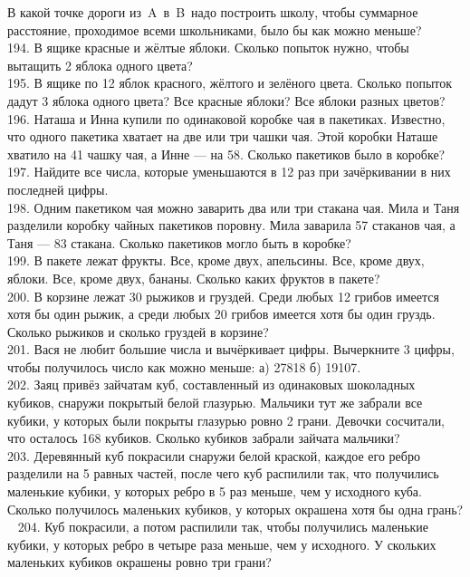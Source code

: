 В какой точке дороги из A в B надо построить школу, чтобы суммарное расстояние, проходимое всеми школьниками, было бы как можно меньше?\\
194. В ящике красные и жёлтые яблоки. Сколько попыток нужно, чтобы вытащить 2 яблока одного цвета?\\
195. В ящике по 12 яблок красного, жёлтого и зелёного цвета. Сколько попыток дадут 3 яблока одного цвета? Все красные яблоки? Все яблоки разных цветов?\\
196. Наташа и Инна купили по одинаковой коробке чая в пакетиках. Известно, что одного пакетика хватает на две или три чашки чая. Этой коробки Наташе хватило на 41 чашку чая, а Инне --- на 58. Сколько пакетиков было в коробке?\\
197. Найдите все числа, которые уменьшаются в 12 раз при зачёркивании в них последней цифры.\\
198. Одним пакетиком чая можно заварить два или три стакана чая. Мила и Таня разделили коробку чайных пакетиков поровну. Мила заварила 57 стаканов чая, а Таня --- 83 стакана. Сколько пакетиков могло быть в коробке?\\
199. В пакете лежат фрукты. Все, кроме двух, апельсины. Все, кроме двух, яблоки. Все, кроме двух, бананы. Сколько каких фруктов в пакете?\\
200. В корзине лежат 30 рыжиков и груздей. Среди любых 12 грибов имеется хотя бы один рыжик, а среди любых 20 грибов имеется хотя бы один груздь. Сколько рыжиков и сколько груздей в корзине?\\
201. Вася не любит большие числа и вычёркивает цифры. Вычеркните 3 цифры, чтобы получилось число как можно меньше: а) 27818 б) 19107.\\
202. Заяц привёз зайчатам куб, составленный из одинаковых шоколадных кубиков, снаружи покрытый белой глазурью. Мальчики тут же забрали все кубики, у которых были покрыты глазурью ровно 2 грани. Девочки сосчитали, что осталось 168 кубиков. Сколько кубиков забрали зайчата мальчики?\\
203. Деревянный куб покрасили снаружи белой краской, каждое его ребро разделили на 5 равных частей, после чего куб распилили так, что получились маленькие кубики, у которых ребро в 5 раз меньше, чем у исходного куба. Сколько получилось маленьких кубиков, у которых окрашена хотя бы одна грань?\\ 
204. Куб покрасили, а потом распилили так, чтобы получились маленькие кубики, у которых ребро в четыре раза меньше, чем у исходного. У скольких маленьких кубиков окрашены ровно три грани?\\
